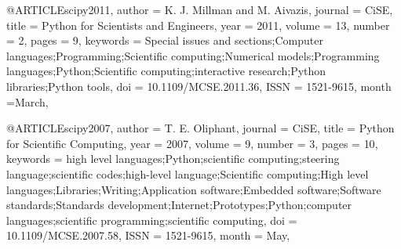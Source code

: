 
@ARTICLE{scipy2011,
   author = {K. J. {Millman} and M. {Aivazis}},
  journal = {CiSE},
    title = {Python for Scientists and Engineers},
     year = {2011},
   volume = {13},
   number = {2},
    pages = {9},
 keywords = {Special issues and sections;Computer languages;Programming;Scientific computing;Numerical models;Programming languages;Python;Scientific computing;interactive research;Python libraries;Python tools},
      doi = {10.1109/MCSE.2011.36},
     ISSN = {1521-9615},
    month ={March},
}

@ARTICLE{scipy2007,
   author = {T. E. {Oliphant}},
  journal = {CiSE},
    title = {Python for Scientific Computing},
     year = {2007},
   volume = {9},
   number = {3},
    pages = {10},
 keywords = {high level languages;Python;scientific computing;steering language;scientific codes;high-level language;Scientific computing;High level languages;Libraries;Writing;Application software;Embedded software;Software standards;Standards development;Internet;Prototypes;Python;computer languages;scientific programming;scientific computing},
      doi = {10.1109/MCSE.2007.58},
     ISSN = {1521-9615},
    month = {May},
}